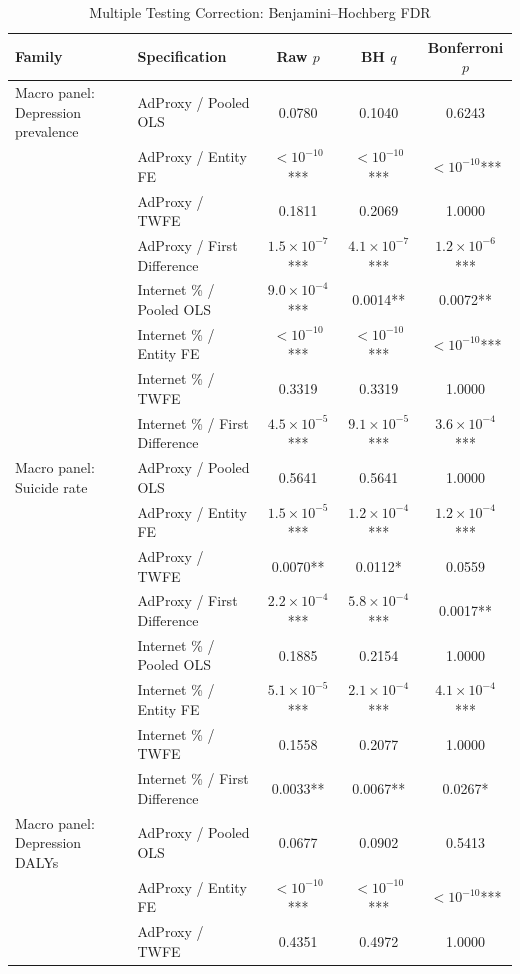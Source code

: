 \begin{table}[htbp]
\centering
\caption{Multiple Testing Correction: Benjamini--Hochberg FDR}
\label{tab:fdr}
\footnotesize
\begin{tabular}{llccc}
\toprule
Family & Specification & Raw $p$ & BH $q$ & Bonferroni $p$ \\
\midrule
  Macro panel: Depression prevalence & AdProxy / Pooled OLS & 0.0780 & 0.1040 & 0.6243 \\
   & AdProxy / Entity FE & $< 10^{-10}$*** & $< 10^{-10}$*** & $< 10^{-10}$*** \\
   & AdProxy / TWFE & 0.1811 & 0.2069 & 1.0000 \\
   & AdProxy / First Difference & $1.5 \times 10^{-7}$*** & $4.1 \times 10^{-7}$*** & $1.2 \times 10^{-6}$*** \\
   & Internet \% / Pooled OLS & $9.0 \times 10^{-4}$*** & 0.0014** & 0.0072** \\
   & Internet \% / Entity FE & $< 10^{-10}$*** & $< 10^{-10}$*** & $< 10^{-10}$*** \\
   & Internet \% / TWFE & 0.3319 & 0.3319 & 1.0000 \\
   & Internet \% / First Difference & $4.5 \times 10^{-5}$*** & $9.1 \times 10^{-5}$*** & $3.6 \times 10^{-4}$*** \\
\addlinespace
  Macro panel: Suicide rate & AdProxy / Pooled OLS & 0.5641 & 0.5641 & 1.0000 \\
   & AdProxy / Entity FE & $1.5 \times 10^{-5}$*** & $1.2 \times 10^{-4}$*** & $1.2 \times 10^{-4}$*** \\
   & AdProxy / TWFE & 0.0070** & 0.0112* & 0.0559 \\
   & AdProxy / First Difference & $2.2 \times 10^{-4}$*** & $5.8 \times 10^{-4}$*** & 0.0017** \\
   & Internet \% / Pooled OLS & 0.1885 & 0.2154 & 1.0000 \\
   & Internet \% / Entity FE & $5.1 \times 10^{-5}$*** & $2.1 \times 10^{-4}$*** & $4.1 \times 10^{-4}$*** \\
   & Internet \% / TWFE & 0.1558 & 0.2077 & 1.0000 \\
   & Internet \% / First Difference & 0.0033** & 0.0067** & 0.0267* \\
\addlinespace
  Macro panel: Depression DALYs & AdProxy / Pooled OLS & 0.0677 & 0.0902 & 0.5413 \\
   & AdProxy / Entity FE & $< 10^{-10}$*** & $< 10^{-10}$*** & $< 10^{-10}$*** \\
   & AdProxy / TWFE & 0.4351 & 0.4972 & 1.0000 \\

\end{tabular}
\end{table}
